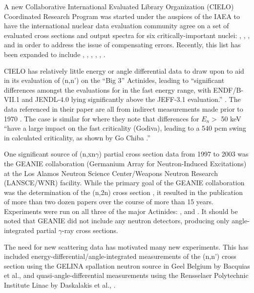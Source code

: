 \documentclass[letterpaper]{ar-1col}
\begin{document}
A new Collaborative International Evaluated Library Organization (CIELO) Coordinated Research Program was started under the auspices of the IAEA \cite{Cha18a} to have the international nuclear data evaluation community agree on a set of evaluated cross sections and output spectra for six critically-important nuclei: , , ,  and  in order to address the issue of compensating errors.
 Recently, this list has been expanded to include , , , , , .

CIELO has relatively little energy or angle differential data to draw upon to aid in its evaluation of (n,n') on the \enquote{Big 3} Actinides, leading to \enquote{significant differences amongst the evaluations for  in the fast energy range, with ENDF/B-VII.1 and JENDL-4.0 lying significantly above the JEFF-3.1 evaluation.} \cite{Cha14}.
 The  data referenced in their paper are all from indirect measurements made prior to 1970 \cite{Batchelor1969, Andreev1961}.
 The case is similar for  where they note that differences for $E_n >$ 50 keV \enquote{have a large impact on the fast criticality (Godiva), leading to a 540 pcm swing in calculated criticality, as shown by Go Chiba \cite{Chi12}.}

One significant source of (n,xn$\gamma$) partial cross section data from 1997 to 2003 was the GEANIE collaboration (Germanium Array for Neutron-Induced Excitations) at the Los Alamos Neutron Science Center/Weapons Neutron Research (LANSCE/WNR) facility.
While the primary goal of the GEANIE collaboration was the determination of the (n,2n) cross section \cite{Ber02}, it resulted in the publication of more than two dozen papers over the course of more than 15 years.
 Experiments were run on all three of the major Actinides:  \cite{You01},  \cite{Ber02} and  \cite{Fot04}.
 It should be noted that GEANIE did not include any neutron detectors, producing only angle-integrated partial $\gamma$-ray cross sections.
 

The need for new scattering data has motivated many new experiments.
 This has included energy-differential/angle-integrated measurements of the (n,n') cross section using the GELINA spallation neutron source in Geel Belgium by Bacquias et al., \cite{Nem13} and quasi-angle-differential measurements using the Rensselaer Polytechnic Institute Linac by Daskalakis et al., \cite{Das14}.
\end{document}
